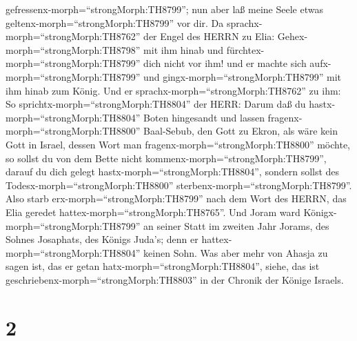 gefressenx-morph=``strongMorph:TH8799''; nun aber laß meine Seele etwas
geltenx-morph=``strongMorph:TH8799'' vor dir.  Da
sprachx-morph=``strongMorph:TH8762'' der Engel des HERRN zu Elia:
Gehex-morph=``strongMorph:TH8798'' mit ihm hinab und
fürchtex-morph=``strongMorph:TH8799'' dich nicht vor ihm! und er machte
sich aufx-morph=``strongMorph:TH8799'' und
gingx-morph=``strongMorph:TH8799'' mit ihm hinab zum König.
 Und er sprachx-morph=``strongMorph:TH8762'' zu ihm: So
sprichtx-morph=``strongMorph:TH8804'' der HERR: Darum daß du
hastx-morph=``strongMorph:TH8804'' Boten hingesandt und lassen
fragenx-morph=``strongMorph:TH8800'' Baal-Sebub, den Gott zu Ekron, als
wäre kein Gott in Israel, dessen Wort man
fragenx-morph=``strongMorph:TH8800'' möchte, so sollst du von dem Bette
nicht kommenx-morph=``strongMorph:TH8799'', darauf du dich gelegt
hastx-morph=``strongMorph:TH8804'', sondern sollst des
Todesx-morph=``strongMorph:TH8800''
sterbenx-morph=``strongMorph:TH8799''.  Also starb
erx-morph=``strongMorph:TH8799'' nach dem Wort des HERRN, das Elia
geredet hattex-morph=``strongMorph:TH8765''. Und Joram ward
Königx-morph=``strongMorph:TH8799'' an seiner Statt im zweiten Jahr
Jorams, des Sohnes Josaphats, des Königs Juda's; denn er
hattex-morph=``strongMorph:TH8804'' keinen Sohn.  Was aber
mehr von Ahasja zu sagen ist, das er getan
hatx-morph=``strongMorph:TH8804'', siehe, das ist
geschriebenx-morph=``strongMorph:TH8803'' in der Chronik der Könige
Israels.

\hypertarget{section-1}{%
\section{2}\label{section-1}}

